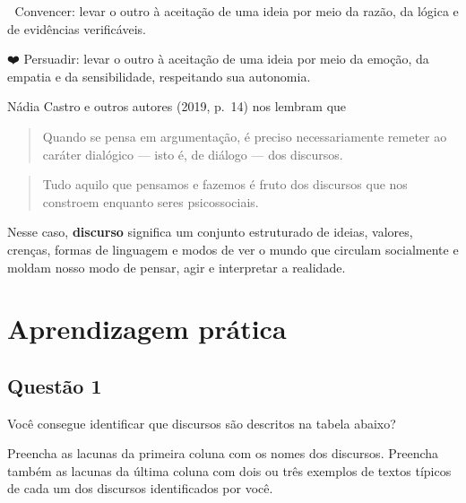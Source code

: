 \documentclass[
  letterpaper,
  DIV=11,
  numbers=noendperiod]{scrreprt}
\begin{document}
🧠 Convencer: levar o outro à aceitação de uma ideia por meio da razão,
da lógica e de evidências verificáveis.

❤️ Persuadir: levar o outro à aceitação de uma ideia por meio da emoção,
da empatia e da sensibilidade, respeitando sua autonomia.

Nádia Castro e outros autores (2019, p.~14) nos lembram que

\begin{quote}
Quando se pensa em argumentação, é preciso necessariamente remeter ao
caráter dialógico --- isto é, de diálogo --- dos discursos.
\end{quote}

\begin{quote}
Tudo aquilo que pensamos e fazemos é fruto dos discursos que nos
constroem enquanto seres psicossociais.
\end{quote}

Nesse caso, \textbf{discurso} significa um conjunto estruturado de
ideias, valores, crenças, formas de linguagem e modos de ver o mundo que
circulam socialmente e moldam nosso modo de pensar, agir e interpretar a
realidade.

\section{Aprendizagem prática}\label{aprendizagem-pruxe1tica-3}

\subsection{Questão 1}\label{questuxe3o-1-3}

Você consegue identificar que discursos são descritos na tabela abaixo?

Preencha as lacunas da primeira coluna com os nomes dos discursos.
Preencha também as lacunas da última coluna com dois ou três exemplos de
textos típicos de cada um dos discursos identificados por você.
\end{document}
